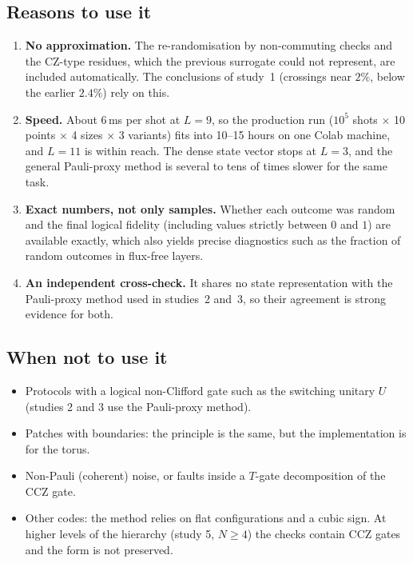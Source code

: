 \documentclass[11pt,a4paper]{article}
\begin{document}
\subsection{Reasons to use it}
\begin{enumerate}
\item \textbf{No approximation.} The re-randomisation by non-commuting checks and the CZ-type residues, which the previous surrogate could not represent, are included automatically. The conclusions of study~1 (crossings near $2\%$, below the earlier $2.4\%$) rely on this.
\item \textbf{Speed.} About 6\,ms per shot at $L=9$, so the production run ($10^5$ shots $\times$ 10 points $\times$ 4 sizes $\times$ 3 variants) fits into 10--15 hours on one Colab machine, and $L=11$ is within reach. The dense state vector stops at $L=3$, and the general Pauli-proxy method is several to tens of times slower for the same task.
\item \textbf{Exact numbers, not only samples.} Whether each outcome was random and the final logical fidelity (including values strictly between $0$ and $1$) are available exactly, which also yields precise diagnostics such as the fraction of random outcomes in flux-free layers.
\item \textbf{An independent cross-check.} It shares no state representation with the Pauli-proxy method used in studies~2 and~3, so their agreement is strong evidence for both.
\end{enumerate}

\subsection{When not to use it}
\begin{itemize}
\item Protocols with a logical non-Clifford gate such as the switching unitary $U$ (studies 2 and 3 use the Pauli-proxy method).
\item Patches with boundaries: the principle is the same, but the implementation is for the torus.
\item Non-Pauli (coherent) noise, or faults inside a $T$-gate decomposition of the CCZ gate.
\item Other codes: the method relies on flat configurations and a cubic sign. At higher levels of the hierarchy (study 5, $N\ge4$) the checks contain CCZ gates and the form is not preserved.
\end{itemize}
\end{document}
